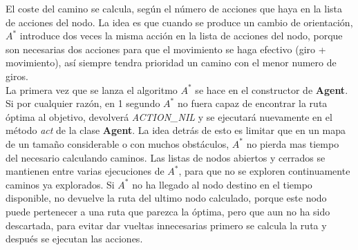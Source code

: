 El coste del camino se calcula, según el número de acciones que haya en la lista de acciones del nodo. La idea es que  cuando se produce un cambio de orientación, $ A^{*} $ introduce dos veces la misma acción en la lista de acciones del nodo, porque son necesarias dos acciones para que el movimiento se haga efectivo (giro + movimiento), así siempre tendra prioridad un camino con el menor numero de giros.\\
La primera vez que se lanza el algoritmo $ A^{*} $ se hace en el constructor de \textbf{Agent}. Si por cualquier razón, en 1 segundo $ A^{*} $ no fuera capaz de encontrar la ruta óptima al objetivo, devolverá \emph{ACTION\_NIL} y se ejecutará nuevamente en el método \emph{act} de la clase \textbf{Agent}. La idea detrás de esto es limitar que en un mapa de un tamaño considerable o con muchos obstáculos, $ A^{*} $ no pierda mas tiempo del necesario calculando caminos. Las listas de nodos abiertos y cerrados se mantienen entre varias ejecuciones de $ A^{*} $, para que no se exploren continuamente caminos ya explorados. Si $ A^{*} $ no ha llegado al nodo destino en el tiempo disponible, no devuelve la ruta del ultimo nodo calculado, porque este nodo puede pertenecer a una ruta que parezca la óptima, pero que aun no ha sido descartada, para evitar dar vueltas innecesarias primero se calcula la ruta y después se ejecutan las acciones.\\
\\

